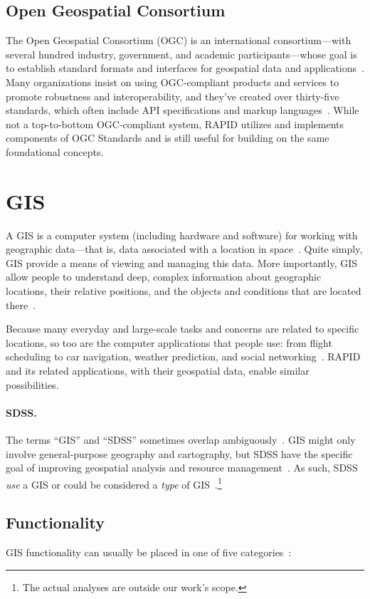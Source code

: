 \subsection{Open Geospatial Consortium}
The Open Geospatial Consortium (OGC) is an international consortium---with several hundred industry, government, and academic participants---whose goal is to establish standard formats and interfaces for geospatial data and applications~\cite{ogc}. Many organizations insist on using OGC-compliant products and services to promote robustness and interoperability, and they've created over thirty-five standards, which often include API specifications and markup languages~\cite{ogc,Dunning2013}. While not a top-to-bottom OGC-compliant system, RAPID utilizes and implements components of OGC Standards and is still useful for building on the same foundational concepts.

\section{GIS}
A GIS is a computer system (including hardware and software) for working with geographic data---that is, data associated with a location in space~\cite{Esriintro,gentle_intro}. Quite simply, GIS provide a means of viewing and managing this data. More importantly, GIS allow people to understand deep, complex information about geographic locations, their relative positions, and the objects and conditions that are located there~\cite{Esriintro,gentle_intro}.

Because many everyday and large-scale tasks and concerns are related to specific locations, so too are the computer applications that people use: from flight scheduling to car navigation, weather prediction, and social networking~\cite{Esriintro}. RAPID and its related applications, with their geospatial data, enable similar possibilities.

\paragraph{SDSS.}
The terms ``GIS'' and ``SDSS'' sometimes overlap ambiguously~\cite{Peterson}. GIS might only involve general-purpose geography and cartography, but SDSS have the specific goal of improving geospatial analysis and resource management~\cite{Peterson}. As such, SDSS \textit{use} a GIS or could be considered a \textit{type} of GIS~\cite{Peterson}.\footnote{The actual analyses are outside our work's scope.}

\subsection{Functionality}
GIS functionality can usually be placed in one of five categories~\cite{Esriintro}:

